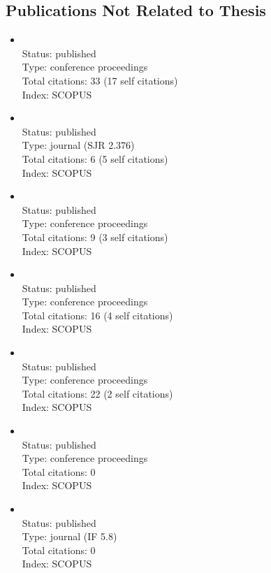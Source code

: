\begin{refsection}
\section*{Publications Not Related to Thesis}
    \begin{itemize}
		\item{}\vspace{2mm}\\Status: published\\Type: conference proceedings\\Total citations: 33 (17 self citations)\\Index: SCOPUS
		\item{}\vspace{2mm}\\Status: published\\Type: journal (SJR 2.376)\\Total citations: 6 (5 self citations)\\Index: SCOPUS
		\item{}\vspace{2mm}\\Status: published\\Type: conference proceedings\\Total citations: 9 (3 self citations)\\Index: SCOPUS
		\item{}\vspace{2mm}\\Status: published\\Type: conference proceedings\\Total citations: 16 (4 self citations)\\Index: SCOPUS
		\item{}\vspace{2mm}\\Status: published\\Type: conference proceedings\\Total citations: 22 (2 self citations)\\Index: SCOPUS
		\item{}\vspace{2mm}\\Status: published\\Type: conference proceedings\\Total citations: 0\\Index: SCOPUS
		\item{}\vspace{2mm}\\Status: published\\Type: journal (IF 5.8)\\Total citations: 0\\Index: SCOPUS

\end{itemize}
\end{refsection}
